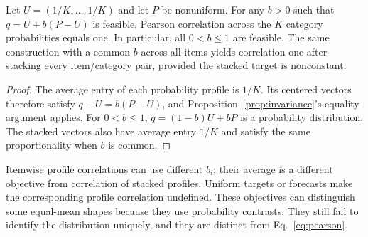 \begin{proposition}\label{prop:profiles}
Let $U=(1/K,\ldots,1/K)$ and let $P$ be nonuniform.
For any $b>0$ such that $q=U+b(P-U)$ is feasible, Pearson correlation across the $K$ category probabilities equals one.
In particular, all $0<b\le1$ are feasible.
The same construction with a common $b$ across all items yields correlation one after stacking every item/category pair, provided the stacked target is nonconstant.
\end{proposition}
\begin{proof}
The average entry of each probability profile is $1/K$.
Its centered vectors therefore satisfy $q-U=b(P-U)$, and Proposition~\ref{prop:invariance}'s equality argument applies.
For $0<b\le1$, $q=(1-b)U+bP$ is a probability distribution.
The stacked vectors also have average entry $1/K$ and satisfy the same proportionality when $b$ is common.
\end{proof}

Itemwise profile correlations can use different $b_i$; their average is a different objective from correlation of stacked profiles.
Uniform targets or forecasts make the corresponding profile correlation undefined.
These objectives can distinguish some equal-mean shapes because they use probability contrasts.
They still fail to identify the distribution uniquely, and they are distinct from Eq.~\eqref{eq:pearson}.
